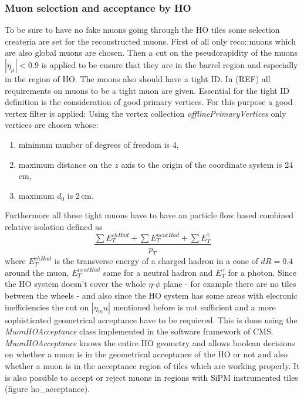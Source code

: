 		\subsubsection{Muon selection and acceptance by HO}
		\label{thesectionhere}
			To be sure to have no fake muons going through the HO tiles some selection createria are set for the reconstructed muons.
			First of all only reco::muons which are also global muons are chosen.
			Then a cut on the pseudorapidity of the muons $|\eta_\mu| < 0.9$ is applied to be ensure that they are in the barrel region and especially in the region of HO.
			The muons also should have a tight ID.
			In (REF) all requirements on muons to be a tight muon are given.
			Essential for the tight ID definition is the consideration of good primary vertices.
			For this purpose a good vertex filter is applied:
			Using the vertex collection \textit{offlinePrimaryVertices} only vertices are chosen whose:
			\begin{enumerate}
				\item minimum number of degrees of freedom is 4,
				\item maximum distance on the $z$ axis to the origin of the coordinate system is 24\,cm,
				\item maximum $d_0$ is 2\,cm.
			\end{enumerate}
			Furthermore all these tight muons have to have an particle flow based combined relative isolation defined as
			\begin{equation}
				\frac{\sum{E_T^{chHad}} + \sum{E_T^{neutHad}} + \sum{E_T^\gamma}}{p_T}
			\end{equation}
			where $E_T^{chHad}$ is the transverse energy of a charged hadron in a cone of $dR = 0.4$ around the muon, $E_T^{neutHad}$ same for a neutral hadron and $E_T^\gamma$ for a photon.
			Since the HO system doesn't cover the whole $\eta$-$\phi$ plane - for example there are no tiles between the wheels - and also since the HO system has some areas with elecronic inefficiencies the
			cut on $|\eta_mu|$ mentioned before is not sufficient and a more sophisticated geometrical acceptance have to be requiered. 
			This is done using the \textit{MuonHOAcceptance} class implemented in the software framework of CMS.
			\textit{MuonHOAcceptance} knows the entire HO geometry and allows boolean decisions on whether a muon is in the geometrical acceptance of the HO or not and also whether a muon is in the acceptance region of
			tiles which are working properly.
			It is also possible to accept or reject muons in regions with SiPM instrumented tiles (figure ho_acceptance).
